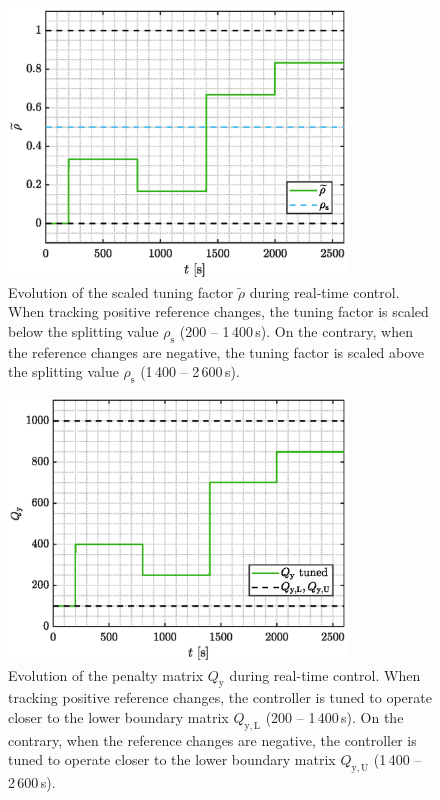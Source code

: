 \documentclass[preprint,12pt]{elsarticle}
\begin{document}
\begin{figure}
	\begin{center}
		\includegraphics[width=0.8\textwidth]{images/rho}
		\caption{Evolution of the scaled tuning factor $\widetilde{\rho}$ during real-time control. When tracking positive reference changes, the tuning factor is scaled below the splitting value $\rho_{\mathrm{s}}$ (200 -- 1\,400\,s). On the contrary, when the reference changes are negative, the tuning factor is scaled above the splitting value $\rho_{\mathrm{s}}$ (1\,400 -- 2\,600\,s).}
		\label{fig:rho}
	\end{center}
\end{figure}

\begin{figure}
	\begin{center}
		\includegraphics[width=0.8\textwidth]{images/Q}
		\caption{Evolution of the penalty matrix $Q_{\mathrm{y}}$ during real-time control. When tracking positive reference changes, the controller is tuned to operate closer to the lower boundary matrix $Q_\mathrm{y, L}$ (200 -- 1\,400\,s). On the contrary, when the reference changes are negative, the controller is tuned to operate closer to the lower boundary matrix $Q_\mathrm{y, U}$ (1\,400 -- 2\,600\,s).}
		\label{fig:Q}
	\end{center}
\end{figure}
\end{document}
